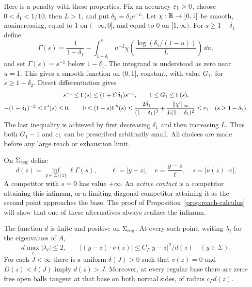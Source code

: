 Here is a penalty with these properties.  Fix an accuracy
$\varepsilon_1>0$, choose $0<\delta_1<1/10$, then $L>1$, and put
$\delta_2=\delta_1e^{-L}$.  Let $\chi:\mathbb R\to[0,1]$
be smooth, nonincreasing, equal to $1$ on $(-\infty,0]$, and equal
to $0$ on $[1,\infty)$.  For $s\ge1-\delta_1$ define
\[
 \Gamma(s)=\frac1{1-\delta_1}
 -\int_{1-\delta_1}^s u^{-2}
   \chi\!\left(\frac{\log(\delta_1/(1-u))}{L}\right)\,\dd u,
\]
and set $\Gamma(s)=s^{-1}$ below $1-\delta_1$.  The integrand is
understood as zero near $u=1$.  This gives a smooth function on
$(0,1]$, constant, with value $G_1$, for $s\ge1-\delta_2$.
Direct differentiation gives
\begin{equation}\label{eq:reach-penalty}
 \begin{gathered}
 s^{-1}\le\Gamma(s)\le(1+C\delta_1)s^{-1},\qquad
 1\le G_1\le\Gamma(s),\\
 -(1-\delta_1)^{-2}\le\Gamma'(s)\le0,\qquad
 0\le(1-s)\Gamma''(s)\le
 \frac{2\delta_1}{(1-\delta_1)^3}
 +\frac{\|\chi'\|_\infty}{L(1-\delta_1)^2}
 \le\varepsilon_1
 \quad(s\ge1-\delta_1).
 \end{gathered}
\end{equation}
The last inequality is achieved by first decreasing $\delta_1$ and
then increasing $L$.  Thus both $G_1-1$ and $\varepsilon_1$ can be prescribed
arbitrarily small.  All choices are made before any large reach or
exhaustion limit.

On $\Sigma_{\rm reg}$ define
\begin{equation}\label{eq:reach-definition}
 d(z)=\inf_{y\in\Sigma\setminus\{z\}}\ell\Gamma(s),\qquad
 \ell=|y-z|,\quad e=\frac{y-z}{\ell},\quad
 s=|\nu(z)\cdot e|.
\end{equation}
A competitor with $s=0$ has value $+\infty$.
An \emph{active contact} is a competitor attaining this infimum, or a
limiting diagonal competitor attaining it as the second point approaches
the base.  The proof of Proposition~\ref{prop:reach-calculus} will show
that one of these alternatives always realizes the infimum.

\begin{lemma}\label{lem:reach-small-defect}
The function $d$ is finite and positive on $\Sigma_{\rm reg}$.
At every such point, writing $\lambda_i$ for the eigenvalues of $A$,
\begin{equation}\label{eq:reach-elementary}
 d\max_i|\lambda_i|\le2,
 \qquad |(y-z)\cdot\nu(z)|\le C_\Gamma |y-z|^2/d(z)
 \quad(y\in\Sigma).
\end{equation}
For each $J<\infty$ there is a uniform $\delta(J)>0$ such that
$v(z)=0$ and $D(z)<\delta(J)$ imply $d(z)>J$.
Moreover, at every regular base there are zero-free open balls tangent
at that base on both normal sides, of radius $c_\Gamma d(z)$.
\end{lemma}

